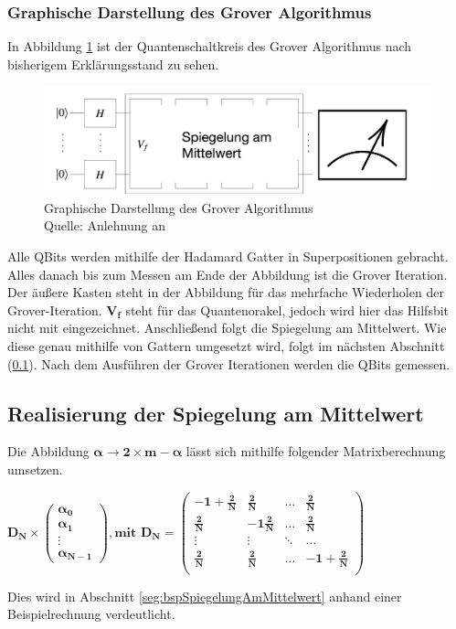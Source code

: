 \subsubsection{Graphische Darstellung des Grover Algorithmus}
In Abbildung \ref{fig:algoInformell} ist der Quantenschaltkreis des Grover Algorithmus nach bisherigem Erklärungsstand zu sehen.
\begin{figure}[hbtp]
	\centering
	\includegraphics[width=1\textwidth]{figures/algoInformell.png}
	\caption{Graphische Darstellung des Grover Algorithmus \\ Quelle: Anlehnung an \cite[S. 146]{Homeister.2018}}
	\label{fig:algoInformell}
\end{figure}
Alle QBits werden mithilfe der Hadamard Gatter in Superpositionen gebracht. Alles danach bis zum Messen am Ende der Abbildung ist die Grover Iteration.
Der äußere Kasten steht in der Abbildung für das mehrfache Wiederholen der Grover-Iteration. $\mathbf{V_f}$ steht für das Quantenorakel, jedoch wird hier das Hilfsbit nicht mit eingezeichnet. Anschließend folgt die Spiegelung am Mittelwert. Wie diese genau mithilfe von Gattern umgesetzt wird, folgt im nächsten Abschnitt (\ref{sec:realiserung}). Nach dem Ausführen der Grover Iterationen werden die QBits gemessen.
\subsection{Realisierung der Spiegelung am Mittelwert}
\label{sec:realiserung}
Die Abbildung $\mathbf{\alpha \rightarrow 2 \times m - \alpha}$ lässt sich mithilfe folgender Matrixberechnung umsetzen.
\begin{center}
	$\mathbf{D_N \times 
		\begin{pmatrix}
			\alpha_0 \\ \alpha_1 \\ \vdots \\  \alpha_{N-1}
		\end{pmatrix}, \text{mit } D_N = 
		\begin{pmatrix}
			-1 + \frac{2}{N} & \frac{2}{N} & \dots& \frac{2}{N} \\
			\frac{2}{N} & -1 \frac{2}{N} & \dots& \frac{2}{N} \\
			\vdots & \vdots & \ddots& \dots \\
			\frac{2}{N} & \frac{2}{N} & \dots& -1+ \frac{2}{N} \\
	\end{pmatrix}}$
\end{center}
Dies wird in Abschnitt \ref{seg:bspSpiegelungAmMittelwert} anhand einer Beispielrechnung verdeutlicht.
